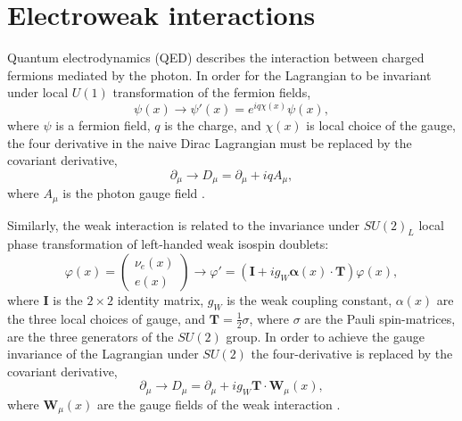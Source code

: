 \section{Electroweak interactions}

Quantum electrodynamics (QED) describes the interaction between charged fermions
mediated by the photon. In order for the Lagrangian to be invariant
under local $U(1)$ transformation of the fermion fields,
\begin{equation}
\psi(x) \rightarrow \psi'(x) = e^{iq\chi(x)}\psi(x),
\end{equation}
where $\psi$ is a fermion field, $q$ is the charge, and $\chi(x)$ is local choice of
the gauge, the four derivative in the naive Dirac Lagrangian must be replaced by
the covariant derivative,
\begin{equation}
\partial_\mu \rightarrow D_\mu = \partial_\mu + i q A_\mu,
\end{equation}
where $A_\mu$ is the photon gauge field \cite{Thomson:2013zua}.

Similarly, the weak interaction is related to the invariance under $SU(2)_L$ local
phase transformation of left-handed weak isospin doublets:
\begin{equation}
\varphi(x) = \begin{pmatrix} \nu_e(x) \\ e(x) \end{pmatrix} \rightarrow
\varphi' = (\mathbf{I} + i g_W \mathbf{\alpha}(x)\cdot\mathbf{T}) \varphi(x),
\end{equation}
where $\mathbf{I}$ is the $2\times2$ identity matrix, $g_W$ is the weak coupling constant,
$\alpha(x)$ are the three local choices of gauge, and $\mathbf{T} = \frac{1}{2}\sigma$,
where $\sigma$ are the Pauli spin-matrices, are the three generators of the $SU(2)$ group.
In order to achieve the gauge invariance of the Lagrangian under $SU(2)$ the four-derivative
is replaced by the covariant derivative,
\begin{equation}
\partial_\mu \rightarrow D_\mu = \partial_\mu + i g_W \mathbf{T} \cdot \mathbf{W}_\mu(x),
\end{equation}
where $\mathbf{W}_\mu(x)$ are the gauge fields of the weak interaction \cite{Thomson:2013zua}.

